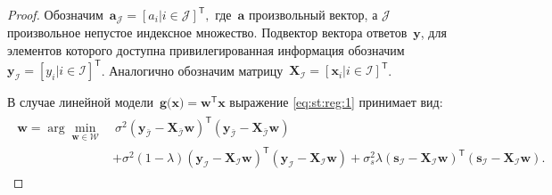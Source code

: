 \documentclass[12pt]{a&t}
\begin{document}
\begin{proof}
Обозначим~$\mathbf{a}_{\mathcal{J}} = [a_i| i \in \mathcal{J}]^{\mathsf{T}},$ где~$\mathbf{a}$ произвольный вектор, а $\mathcal{J}$ произвольное непустое индексное множество. Подвектор вектора ответов~$\mathbf{y}$, для элементов которого доступна привилегированная информация обозначим $\mathbf{y}_{\mathcal{I}} = [y_i| i \in \mathcal{I}]^{\mathsf{T}}$. Аналогично обозначим матрицу~$\mathbf{X}_\mathcal{I}=[\mathbf{x}_{i}| i \in \mathcal{I}]^{\mathsf{T}}$.

В случае линейной модели~$\mathbf{g}\bigr(\mathbf{x}\bigr) = \mathbf{w}^{\mathsf{T}}\mathbf{x}$ выражение \eqref{eq:st:reg:1} принимает вид:
\begin{gather}
\label{eq:st:reg:2}
\begin{aligned}
\hat{\mathbf{w}} = \arg\min_{\mathbf{w}\in \mathcal{W}} &~ \sigma^2\left(\mathbf{y}_{\bar{\mathcal{I}}}-\mathbf{X}_{\bar{\mathcal{I}}}\mathbf{w}\right)^{\mathsf{T}}\left(\mathbf{y}_{\bar{\mathcal{I}}}-\mathbf{X}_{\bar{\mathcal{I}}}\mathbf{w}\right) \\
&+ \sigma^2\left(1-\lambda\right)\left(\mathbf{y}_{\mathcal{I}}-\mathbf{X}_{\mathcal{I}}\mathbf{w}\right)^{\mathsf{T}}\left(\mathbf{y}_{\mathcal{I}}-\mathbf{X}_{\mathcal{I}}\mathbf{w}\right) + \sigma^2_s\lambda\left(\mathbf{s}_{\mathcal{I}}-\mathbf{X}_{\mathcal{I}}\mathbf{w}\right)^{\mathsf{T}}\left(\mathbf{s}_{\mathcal{I}}-\mathbf{X}_{\mathcal{I}}\mathbf{w}\right).
\end{aligned}
\end{gather}


\end{proof}
\end{document}

